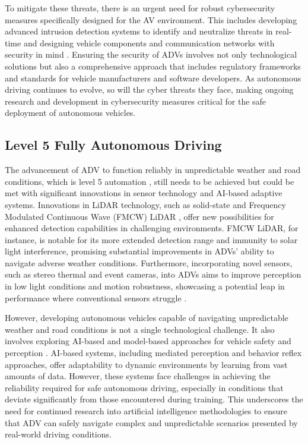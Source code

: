 \documentclass[lettersize,journal]{IEEEtran}
\begin{document}
To mitigate these threats, there is an urgent need for robust cybersecurity measures specifically designed for the AV environment. This includes developing advanced intrusion detection systems to identify and neutralize threats in real-time and designing vehicle components and communication networks with security in mind \cite{Chattopadhyay2020}. Ensuring the security of ADVs involves not only technological solutions but also a comprehensive approach that includes regulatory frameworks and standards for vehicle manufacturers and software developers. As autonomous driving continues to evolve, so will the cyber threats they face, making ongoing research and development in cybersecurity measures critical for the safe deployment of autonomous vehicles.

\color{black}\subsection{ Level 5 Fully Autonomous Driving}

The advancement of ADV to function reliably in unpredictable weather and road conditions, which is level 5 automation \cite{SAE}, still needs to be achieved but could be met with significant innovations in sensor technology and AI-based adaptive systems. Innovations in LiDAR technology, such as solid-state and Frequency Modulated Continuous Wave (FMCW) LiDAR \cite{kim2022}, offer new possibilities for enhanced detection capabilities in challenging environments. FMCW LiDAR, for instance, is notable for its more extended detection range and immunity to solar light interference, promising substantial improvements in ADVs' ability to navigate adverse weather conditions. Furthermore, incorporating novel sensors, such as stereo thermal and event cameras, into ADVs aims to improve perception in low light conditions and motion robustness, showcasing a potential leap in performance where conventional sensors struggle \cite{Bhadoriya2022}.

However, developing autonomous vehicles capable of navigating unpredictable weather and road conditions is not a single technological challenge. It also involves exploring AI-based and model-based approaches for vehicle safety and perception \cite{Li2018}. AI-based systems, including mediated perception and behavior reflex approaches, offer adaptability to dynamic environments by learning from vast amounts of data. However, these systems face challenges in achieving the reliability required for safe autonomous driving, especially in conditions that deviate significantly from those encountered during training. This underscores the need for continued research into artificial intelligence methodologies to ensure that ADV can safely navigate complex and unpredictable scenarios presented by real-world driving conditions.
\end{document}
